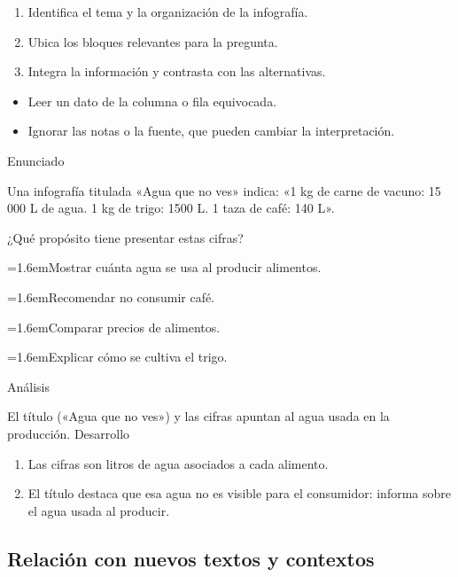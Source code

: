 \documentclass[10pt,a4paper,twocolumn]{article}
\newcommand{\alternativa}[2]{\par\noindent\hangindent=1.6em\hangafter=1\makebox[1.6em][l]{\tecla{#1}}#2\par}
\newcommand{\clave}[1]{\par\smallskip{\sffamily\footnotesize\color{esmeralda} Clave \teclaok{#1}}\par}
\begin{document}
\begin{metodo}
\begin{enumerate}
  \item Identifica el tema y la organización de la infografía.
  \item Ubica los bloques relevantes para la pregunta.
  \item Integra la información y contrasta con las alternativas.
\end{enumerate}
\end{metodo}

\begin{errorfrecuente}
\begin{itemize}
  \item Leer un dato de la columna o fila equivocada.
  \item Ignorar las notas o la fuente, que pueden cambiar la interpretación.
\end{itemize}
\end{errorfrecuente}

\begin{ejemplo}
{\sffamily\footnotesize\color{zinc500} Enunciado}\par
Una infografía titulada «Agua que no ves» indica: «1 kg de carne de vacuno: 15 000 L de agua. 1 kg de trigo: 1500 L. 1 taza de café: 140 L».

¿Qué propósito tiene presentar estas cifras?
\alternativa{A}{Mostrar cuánta agua se usa al producir alimentos.}
\alternativa{B}{Recomendar no consumir café.}
\alternativa{C}{Comparar precios de alimentos.}
\alternativa{D}{Explicar cómo se cultiva el trigo.}
\clave{A}
{\sffamily\footnotesize\color{zinc500} Análisis}\par El título («Agua que no ves») y las cifras apuntan al agua usada en la producción.
{\sffamily\footnotesize\color{zinc500} Desarrollo}
\begin{enumerate}
  \item Las cifras son litros de agua asociados a cada alimento.
  \item El título destaca que esa agua no es visible para el consumidor: informa sobre el agua usada al producir.
\end{enumerate}
\end{ejemplo}

\subsection{Relación con nuevos textos y contextos}
\end{document}
